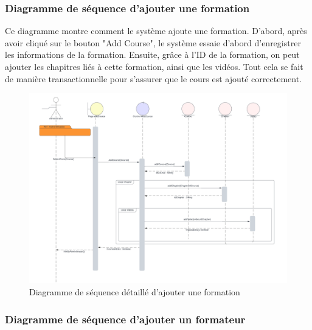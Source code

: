 \subsubsection*{Diagramme de séquence d’ajouter une formation}

Ce diagramme montre comment le système ajoute une formation. D'abord, après avoir cliqué sur le bouton "Add Course", le système essaie d'abord d'enregistrer les informations de la formation. Ensuite, grâce à l'ID de la formation, on peut ajouter les chapitres liés à cette formation, ainsi que les vidéos. Tout cela se fait de manière transactionnelle pour s'assurer que le cours est ajouté correctement. 

\begin{figure}[H]
    \centering
    \includegraphics[width=19cm]{Figures/addcourseSequence.png}
    \caption{Diagramme de séquence détaillé d’ajouter une formation}
\end{figure}

\subsubsection*{Diagramme de séquence d’ajouter un formateur }

